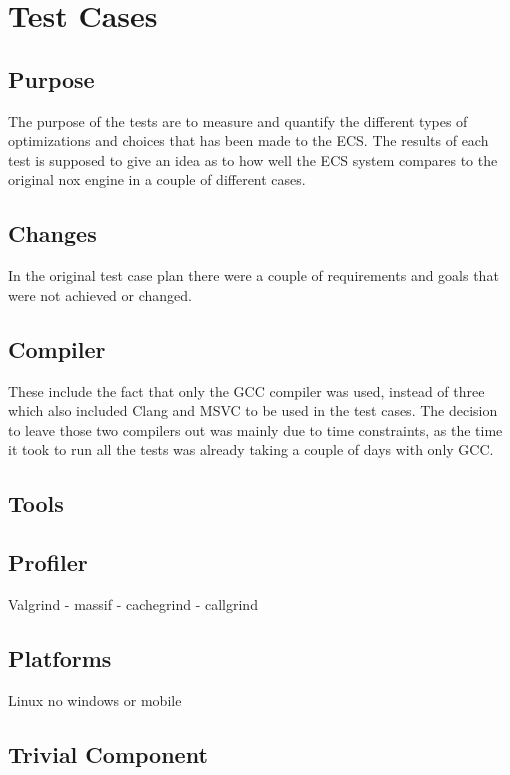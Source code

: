 \section{Test Cases}

\subsection{Purpose}
The purpose of the tests are to measure and quantify the different types of optimizations and choices that has been made to the ECS.
The results of each test is supposed to give an idea as to how well the ECS system compares to the original nox engine in a couple of different cases.

\subsection{Changes}
In the original test case plan there were a couple of requirements and goals that were not achieved or changed.

\subsection{Compiler}
These include the fact that only the GCC compiler was used, instead of three which also included Clang and MSVC to be used in the test cases.
The decision to leave those two compilers out was mainly due to time constraints, as the time it took to run all the tests was already taking a couple of days with only GCC.



\subsection{Tools}


\subsection{Profiler}
Valgrind
- massif
- cachegrind
- callgrind


\subsection{Platforms}
Linux
no windows or mobile


\subsection{Trivial Component}




